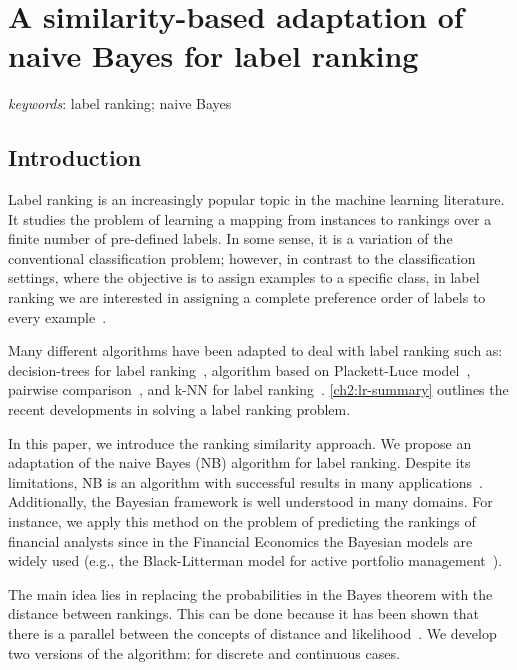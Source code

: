 \documentclass[a4paper,twoside,12pt,openright,notitlepage]{report}\usepackage[]{graphicx}\usepackage[]{color}
\begin{document}
\chapter{A similarity-based adaptation of naive Bayes for label ranking}
\label{ch2}
\begin{abstract}

\end{abstract}
\textit{keywords}: label ranking; naive Bayes \\








\section{Introduction}
Label ranking is an increasingly popular topic in the machine learning literature. It studies the problem of learning a mapping from instances to rankings over a finite number of pre-defined labels. In some sense, it is a variation of the conventional classification problem; however, in contrast to the classification settings, where the objective is to assign examples to a specific class, in label ranking we are interested in assigning a complete preference order of labels to every example~\citep{cheng2009}.

Many different algorithms have been adapted to deal with label ranking such as: decision-trees for label ranking~\citep{cheng2009}, algorithm based on Plackett-Luce model~\citep{cheng2010}, pairwise comparison~\citep{hullermeier}, and k-NN for label ranking~\citep{brazdil2003}. \ref{ch2:lr-summary} outlines the recent developments in solving a label ranking problem.

In this paper, we introduce the ranking similarity approach. We propose an adaptation of the naive Bayes (NB) algorithm for label ranking. Despite its limitations, NB is an algorithm with successful results in many applications~\citep{domingos1997}. Additionally, the Bayesian framework is well understood in many domains. For instance, we apply this method on the problem of predicting the rankings of financial analysts since in the Financial Economics the Bayesian models are widely used (e.g., the Black-Litterman model for active portfolio management~\citep{black1992}).

The main idea lies in replacing the probabilities in the Bayes theorem with the distance between rankings. This can be done because it has been shown that there is a parallel between the concepts of distance and likelihood~\citep{vogt2007}. We develop two versions of the algorithm: for discrete and continuous cases.
\end{document}

